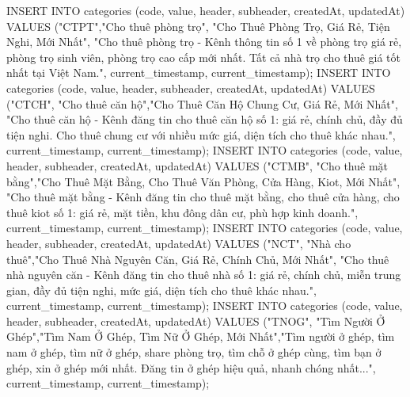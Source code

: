 INSERT INTO categories (code, value, header, subheader, createdAt, updatedAt) VALUES ("CTPT","Cho thuê phòng trọ", "Cho Thuê Phòng Trọ, Giá Rẻ, Tiện Nghi, Mới Nhất", "Cho thuê phòng trọ - Kênh thông tin số 1 về phòng trọ giá rẻ, phòng trọ sinh viên, phòng trọ cao cấp mới nhất. Tất cả nhà trọ cho thuê giá tốt nhất tại Việt Nam.", current_timestamp, current_timestamp);
INSERT INTO categories (code, value, header, subheader, createdAt, updatedAt) VALUES ("CTCH", "Cho thuê căn hộ","Cho Thuê Căn Hộ Chung Cư, Giá Rẻ, Mới Nhất", "Cho thuê căn hộ - Kênh đăng tin cho thuê căn hộ số 1: giá rẻ, chính chủ, đầy đủ tiện nghi. Cho thuê chung cư với nhiều mức giá, diện tích cho thuê khác nhau.", current_timestamp, current_timestamp);
INSERT INTO categories (code, value, header, subheader, createdAt, updatedAt) VALUES ("CTMB", "Cho thuê mặt bằng","Cho Thuê Mặt Bằng, Cho Thuê Văn Phòng, Cửa Hàng, Kiot, Mới Nhất", "Cho thuê mặt bằng - Kênh đăng tin cho thuê mặt bằng, cho thuê cửa hàng, cho thuê kiot số 1: giá rẻ, mặt tiền, khu đông dân cư, phù hợp kinh doanh.", current_timestamp, current_timestamp);
INSERT INTO categories (code, value, header, subheader, createdAt, updatedAt) VALUES ("NCT", "Nhà cho thuê","Cho Thuê Nhà Nguyên Căn, Giá Rẻ, Chính Chủ, Mới Nhất", "Cho thuê nhà nguyên căn - Kênh đăng tin cho thuê nhà số 1: giá rẻ, chính chủ, miễn trung gian, đầy đủ tiện nghi, mức giá, diện tích cho thuê khác nhau.", current_timestamp, current_timestamp);
INSERT INTO categories (code, value, header, subheader, createdAt, updatedAt) VALUES ("TNOG", "Tìm Người Ở Ghép","Tìm Nam Ở Ghép, Tìm Nữ Ở Ghép, Mới Nhất","Tìm người ở ghép, tìm nam ở ghép, tìm nữ ở ghép, share phòng trọ, tìm chỗ ở ghép cùng, tìm bạn ở ghép, xin ở ghép mới nhất. Đăng tin ở ghép hiệu quả, nhanh chóng nhất...", current_timestamp, current_timestamp);